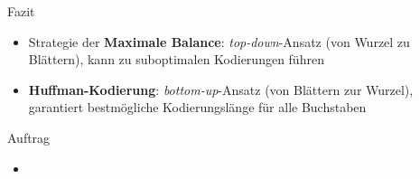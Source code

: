 \begin{frame}{Fazit}
	\begin{itemize}
		\item Strategie der \textbf{Maximale Balance}: \textit{top-down}-Ansatz (von Wurzel zu Blättern), kann zu suboptimalen Kodierungen führen
		\item \textbf{Huffman-Kodierung}: \textit{bottom-up}-Ansatz (von Blättern zur Wurzel), garantiert bestmögliche Kodierungslänge für alle Buchstaben
	\end{itemize}
\end{frame}

\begin{frame}[label=auftrag]{Auftrag}
	\begin{itemize}
		\item {}
	\end{itemize}
\end{frame}
